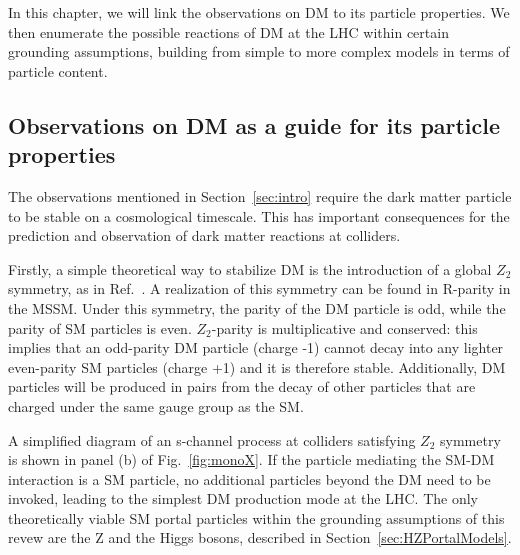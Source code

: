 

In this chapter, we will link the observations on DM to its particle properties. We then enumerate the possible reactions of DM at the LHC within certain grounding assumptions, building from simple to more complex models in terms of particle content. 

\subsection{Observations on DM as a guide for its particle properties}
\label{sec:DMObservations}

The observations mentioned in Section~\ref{sec:intro} require the dark matter particle to be stable on a cosmological timescale. This has important consequences for the prediction and observation of dark matter reactions at colliders. 

Firstly, a simple theoretical way to stabilize DM is the introduction
of a global $Z_2$ symmetry, as in Ref.~\cite{Batell:2010bp}. A realization of this
symmetry can be found in R-parity in the MSSM. %
Under this symmetry, the parity of the DM particle is odd, while the parity of SM particles is even. 
$Z_2$-parity is multiplicative and conserved: this 
implies that an odd-parity DM particle (charge -1) cannot decay into any 
lighter even-parity SM particles (charge +1) and it is therefore stable. 
Additionally, DM particles will be produced in pairs from the decay of other particles
that are charged under the same gauge group as the SM. 

A simplified diagram of an s-channel process at colliders satisfying $Z_2$ symmetry is shown in panel (b) of Fig.~\ref{fig:monoX}.
If the particle mediating the SM-DM interaction is a SM particle, no additional particles beyond the DM need to be invoked, leading to the simplest DM production mode at the LHC. The only theoretically viable SM portal particles within the grounding assumptions of this revew are the Z and the Higgs bosons, described in Section~\ref{sec:HZPortalModels}. 

